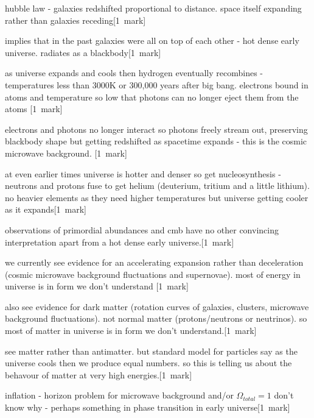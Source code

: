 \setlength{\textheight}{1.3\textheight}


\parskip=12pt
\parindent=0pt
\large

hubble law - galaxies redshifted proportional to distance. space itself expanding 
rather than galaxies receding\hfill[1~mark]

implies that in the past galaxies were all on top of each other - hot dense 
early universe. radiates as a blackbody\hfill[1~mark]

as universe expands and cools then hydrogen eventually recombines - temperatures
less than 3000K or 300,000 years after big bang. electrons bound in atoms and
temperature so low that photons can no longer eject them from the atoms
\hfill[1~mark]

electrons and photons no longer interact so photons freely stream out, preserving
blackbody shape but getting redshifted as spacetime expands - this is the 
cosmic microwave background. \hfill[1~mark]

at even earlier times universe is hotter and denser so get nucleosynthesis
- neutrons and protons fuse to get helium (deuterium, tritium and a little
lithium). no heavier elements as they need higher temperatures but universe
getting cooler as it expands\hfill[1~mark]

observations of primordial abundances and cmb have no other convincing interpretation
apart from a hot dense early universe.\hfill[1~mark]

we currently see evidence for an accelerating expansion rather than
deceleration (cosmic microwave background fluctuations and supernovae).
most of energy in universe is in form we don't understand
\hfill[1~mark]

also see evidence for dark matter (rotation curves of galaxies, clusters, microwave
background fluctuations). not normal matter (protons/neutrons or neutrinos). so
most of matter in universe is in form we don't understand.\hfill[1~mark]

see matter rather than antimatter. but standard model for particles say as the universe
cools then we produce equal numbers. so this is telling us about the 
behavour of matter at very high energies.\hfill[1~mark]

inflation - horizon problem for microwave background and/or $\Omega_{total}=1$
don't know why - perhaps something in phase transition in early
universe\hfill[1~mark]

